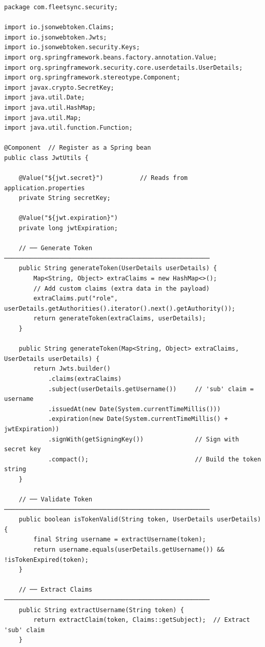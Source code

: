 \documentclass[12pt,a4paper]{report}
\begin{document}
\begin{lstlisting}[caption=JwtUtils.java -- JWT Generation and Validation]
package com.fleetsync.security;

import io.jsonwebtoken.Claims;
import io.jsonwebtoken.Jwts;
import io.jsonwebtoken.security.Keys;
import org.springframework.beans.factory.annotation.Value;
import org.springframework.security.core.userdetails.UserDetails;
import org.springframework.stereotype.Component;
import javax.crypto.SecretKey;
import java.util.Date;
import java.util.HashMap;
import java.util.Map;
import java.util.function.Function;

@Component  // Register as a Spring bean
public class JwtUtils {

    @Value("${jwt.secret}")          // Reads from application.properties
    private String secretKey;

    @Value("${jwt.expiration}")
    private long jwtExpiration;

    // ── Generate Token ────────────────────────────────────────────────────────
    public String generateToken(UserDetails userDetails) {
        Map<String, Object> extraClaims = new HashMap<>();
        // Add custom claims (extra data in the payload)
        extraClaims.put("role", userDetails.getAuthorities().iterator().next().getAuthority());
        return generateToken(extraClaims, userDetails);
    }

    public String generateToken(Map<String, Object> extraClaims, UserDetails userDetails) {
        return Jwts.builder()
            .claims(extraClaims)
            .subject(userDetails.getUsername())     // 'sub' claim = username
            .issuedAt(new Date(System.currentTimeMillis()))
            .expiration(new Date(System.currentTimeMillis() + jwtExpiration))
            .signWith(getSigningKey())              // Sign with secret key
            .compact();                             // Build the token string
    }

    // ── Validate Token ────────────────────────────────────────────────────────
    public boolean isTokenValid(String token, UserDetails userDetails) {
        final String username = extractUsername(token);
        return username.equals(userDetails.getUsername()) && !isTokenExpired(token);
    }

    // ── Extract Claims ────────────────────────────────────────────────────────
    public String extractUsername(String token) {
        return extractClaim(token, Claims::getSubject);  // Extract 'sub' claim
    }


\end{lstlisting}
\end{document}
